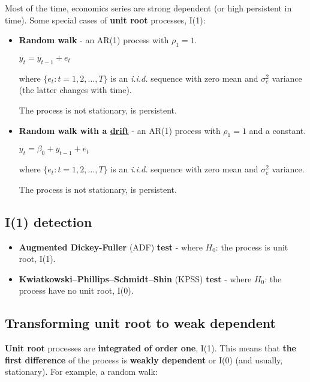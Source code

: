 \documentclass[10pt, a4paper, landscape]{extarticle}
\begin{document}
\begin{multicols}{3}
Most of the time, economics series are strong dependent (or high persistent in time). Some special cases of \textbf{unit root} processes, I(1):

\begin{itemize}[leftmargin=*]
		\item \textbf{Random walk} - an AR(1) process with $\rho_1 = 1$.
	\begin{center}
		$y_t = y_{t - 1} + e_t$
	\end{center}
	where $\lbrace e_t : t = 1, 2, \ldots, T \rbrace$ is an \textsl{i.i.d.} sequence with zero mean and $\sigma^2_e$ variance (the latter changes with time).
	
	The process is not stationary, is persistent.
	
	\item \textbf{Random walk with a \href{https://www.youtube.com/watch?v=pS5d77DQHOI}{drift}} - an AR(1) process with $\rho_1 = 1$ and a constant.
	\begin{center}
		$y_t = \beta_0 + y_{t - 1} + e_t$
	\end{center}
	where $\lbrace e_t : t = 1, 2, \ldots, T \rbrace$ is an \textsl{i.i.d.} sequence with zero mean and $\sigma^2_e$ variance.

	The process is not stationary, is persistent.
\end{itemize}

\subsection*{I(1) detection}

\begin{itemize}[leftmargin=*]
	\item \textbf{Augmented Dickey-Fuller} (ADF) \textbf{test} - where $H_0$: the process is unit root, I(1).
	\item \textbf{Kwiatkowski–Phillips–Schmidt–Shin} (KPSS) \textbf{test} - where $H_0$: the process have no unit root, I(0).
\end{itemize}

\subsection*{Transforming unit root to weak dependent}

\textbf{Unit root} processes are \textbf{integrated of order one}, I(1). This means that \textbf{the first difference} of the process is \textbf{weakly dependent} or I(0) (and usually, stationary). For example, a random walk:


\end{multicols}
\end{document}
